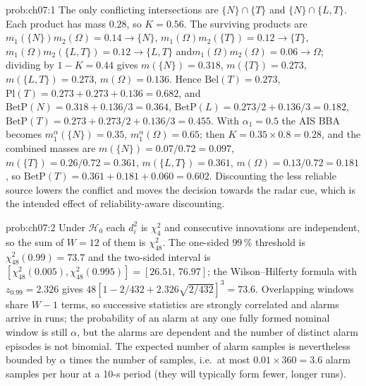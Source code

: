 \begin{sol}{prob:ch07:1}
The only conflicting intersections are $\{N\}\cap\{T\}$ and $\{N\}\cap\{L,T\}$. Each product has mass $0.28$, so $K=0.56$. The surviving products are $m_1(\{N\})m_2(\Omega)=0.14\to\{N\}$, $m_1(\Omega)m_2(\{T\})=0.12\to\{T\}$, $m_1(\Omega)m_2(\{L,T\})=0.12\to\{L,T\}$ and\allowbreak $m_1(\Omega)m_2(\Omega)=0.06\to\Omega$; dividing by $1-K=0.44$ gives $m(\{N\})=0.318$, $m(\{T\})=0.273$, $m(\{L,T\})=0.273$, $m(\Omega)=0.136$. Hence $\mathrm{Bel}(T)=0.273$, $\mathrm{Pl}(T)=0.273+0.273+0.136=0.682$, and $\mathrm{BetP}(N)=0.318+0.136/3=0.364$, $\mathrm{BetP}(L)=0.273/2+0.136/3=0.182$, $\mathrm{BetP}(T)=0.273+0.273/2+0.136/3=0.455$. With $\alpha_1=0.5$ the AIS BBA becomes $m_1^{\alpha}(\{N\})=0.35$, $m_1^{\alpha}(\Omega)=0.65$; then $K=0.35\times0.8=0.28$, and the combined masses are $m(\{N\})=0.07/0.72=0.097$, $m(\{T\})=0.26/0.72=0.361$, $m(\{L,T\})=0.361$, $m(\Omega)=0.13/0.72=0.181$, so $\mathrm{BetP}(T)=0.361+0.181+0.060=0.602$. Discounting the less reliable source lowers the conflict and moves the decision towards the radar cue, which is the intended effect of reliability-aware discounting.
\end{sol}
\begin{sol}{prob:ch07:2}
Under $\mathcal{H}_0$ each $d_i^{2}$ is $\chi^{2}_{4}$ and consecutive innovations are independent, so the sum of $W=12$ of them is $\chi^{2}_{48}$. The one-sided $99\,\%$ threshold is $\chi^{2}_{48}(0.99)=73.7$ and the two-sided interval is $[\chi^{2}_{48}(0.005),\chi^{2}_{48}(0.995)]=[26.51,\,76.97]$; the Wilson--Hilferty formula with $z_{0.99}=2.326$ gives $48[1-2/432+2.326\sqrt{2/432}]^{3}=73.6$. Overlapping windows share $W-1$ terms, so successive statistics are strongly correlated and alarms arrive in runs; the probability of an alarm at any one fully formed nominal window is still $\alpha$, but the alarms are dependent and the number of distinct alarm episodes is not binomial. The expected number of alarm samples is nevertheless bounded by $\alpha$ times the number of samples, i.e.\ at most $0.01\times360=3.6$ alarm samples per hour at a 10-s period (they will typically form fewer, longer runs).
\end{sol}
